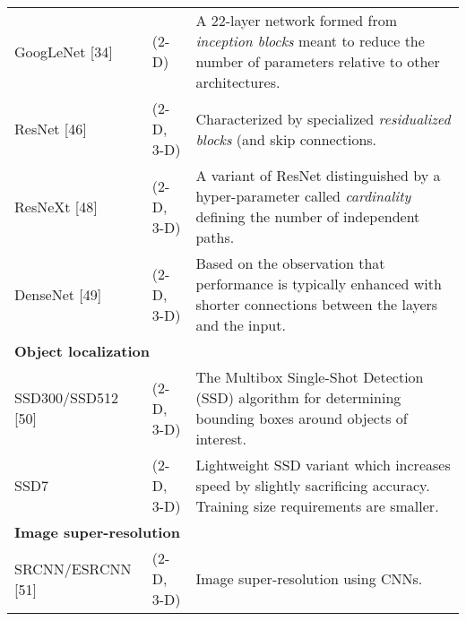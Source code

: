 \begin{table}[!htb]
\begin{tabular*}{\textwidth}{ll@{\extracolsep{\fill}}l}
  GoogLeNet [34] & (2-D) & 
    \begin{minipage}[t]{0.6\columnwidth}%
        A 22-layer network formed from {\em inception blocks} meant
        to reduce the number of parameters relative to other architectures.
    \end{minipage} \\ \vspace{0.2cm} 
  ResNet [46]  & (2-D, 3-D) & 
    \begin{minipage}[t]{0.6\columnwidth}%
        Characterized by specialized {\em residualized blocks} (and
        skip connections. %
    \end{minipage} \\ \vspace{0.2cm} 
  ResNeXt [48] & (2-D, 3-D) &
    \begin{minipage}[t]{0.6\columnwidth}%
        A variant of ResNet distinguished by a hyper-parameter called 
        {\em cardinality} defining the number of independent paths. %
    \end{minipage} \\ \vspace{0.3cm} 
  DenseNet [49] & (2-D, 3-D) & 
    \begin{minipage}[t]{0.6\columnwidth}%
        Based on the observation that performance is typically enhanced 
        with shorter connections between the layers and the input.%
    \end{minipage} \\
\midrule    
\multicolumn{3}{l}{\textbf{Object localization}} 
  \vspace{0.25cm} \\ \vspace{0.2cm} 
  SSD300/SSD512 [50] & (2-D, 3-D) & 
    \begin{minipage}[t]{0.6\columnwidth}%
        The Multibox Single-Shot Detection (SSD) algorithm for
        determining bounding boxes around objects of interest. %
    \end{minipage} \\ \vspace{0.2cm} 
  SSD7 & (2-D, 3-D) & 
    \begin{minipage}[t]{0.6\columnwidth}%
        Lightweight SSD variant which increases speed by slightly sacrificing
        accuracy.  Training size requirements are smaller. %
  \end{minipage} \\
\midrule    
\multicolumn{3}{l}{\textbf{Image super-resolution}} 
  \vspace{0.25cm} \\ \vspace{0.2cm} 
  SRCNN/ESRCNN [51] & (2-D, 3-D) & 
    \begin{minipage}[t]{0.6\columnwidth}%
        Image super-resolution using CNNs. %
    \end{minipage} \\ 
  \bottomrule
\end{tabular*}
\end{table}


